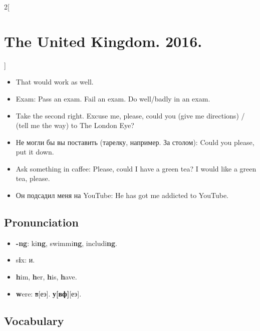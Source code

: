 \documentclass[10pt,a4paper]{article}
\newlength{\OriginalParIndent}
\newenvironment{ItemizeWithOrigParIndent}
    {\begin{itemize}[leftmargin=\OriginalParIndent]}
    {\end{itemize}}
\begin{document}
\begin{multicols}{2}[\section{The United Kingdom. 2016.}]
\begin{ItemizeWithOrigParIndent}
  \item That would work as well.
  \item Exam: Pass an exam. Fail an exam. Do well/badly in an exam.
  \item Take the second right. Excuse me, please, could you (give me directions) /
        (tell me the way) to The London Eye?
  \item Не могли бы вы поставить (тарелку, например. За столом): Could you please, put it down.
  \item Ask something in caffee: Please, could I have a green tea? I would like a green tea, please.
  \item Он подсадил меня на YouTube: He has got me addicted to YouTube.
\end{ItemizeWithOrigParIndent}



\subsection{Pronunciation}
\begin{ItemizeWithOrigParIndent}
  \item \textbf{-ng}: ki\textbf{ng}, swimmi\textbf{ng}, includi\textbf{ng}.
  \item s\textbf{i}x: и.
  \item \textbf{h}im, \textbf{h}er, \textbf{h}is, \textbf{h}ave.
  \item \textbf{w}ere: \sout{в}[еэ]. \textbf{у[вф]}[еэ].
\end{ItemizeWithOrigParIndent}



\subsection{Vocabulary}


\end{multicols}
\end{document}
